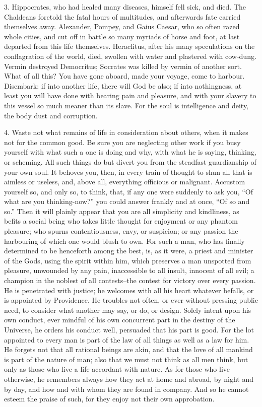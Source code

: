 \documentclass{book}
\begin{document}
3. Hippocrates, who had healed many diseases, himself fell sick, and
died. The Chaldeans foretold the fatal hours of multitudes, and
afterwards fate carried themselves away. Alexander, Pompey, and Gaius
Caesar, who so often razed whole cities, and cut off in battle so many
myriads of horse and foot, at last departed from this life
themselves. Heraclitus, after his many speculations on the
conflagration of the world, died, swollen with water and plastered
with cow-dung. Vermin destroyed Democritus; Socrates was killed by
vermin of another sort. What of all this? You have gone aboard, made
your voyage, come to harbour. Disembark: if into another life, there
will God be also; if into nothingness, at least you will have done
with bearing pain and pleasure, and with your slavery to this vessel
so much meaner than its slave. For the soul is intelligence and deity,
the body dust and corruption.

4. Waste not what remains of life in consideration about others, when
it makes not for the common good. Be sure you are neglecting other
work if you busy yourself with what such a one is doing and why, with
what he is saying, thinking, or scheming. All such things do but
divert you from the steadfast guardianship of your own soul. It
behoves you, then, in every train of thought to shun all that is
aimless or useless, and, above all, everything officious or
malignant. Accustom yourself so, and only so, to think, that, if any
one were suddenly to ask you, ``Of what are you thinking-now?'' you
could answer frankly and at once, ``Of so and so.'' Then it will plainly
appear that you are all simplicity and kindliness, as befits a social
being who takes little thought for enjoyment or any phantom pleasure;
who spurns contentiousness, envy, or suspicion; or any passion the
harbouring of which one would blush to own. For such a man, who has
finally determined to be henceforth among the best, is, as it were, a
priest and minister of the Gods, using the spirit within him, which
preserves a man unspotted from pleasure, unwounded by any pain,
inaccessible to all insult, innocent of all evil; a champion in the
noblest of all contests--the contest for victory over every
passion. He is penetrated with justice; he welcomes with all his heart
whatever befalls, or is appointed by Providence. He troubles not
often, or ever without pressing public need, to consider what another
may say, or do, or design. Solely intent upon his own conduct, ever
mindful of his own concurrent part in the destiny of the Universe, he
orders his conduct well, persuaded that his part is good. For the lot
appointed to every man is part of the law of all things as well as a
law for him. He forgets not that all rational beings are akin, and
that the love of all mankind is part of the nature of man; also that
we must not think as all men think, but only as those who live a life
accordant with nature. As for those who live otherwise, he remembers
always how they act at home and abroad, by night and by day, and how
and with whom they are found in company. And so he cannot esteem the
praise of such, for they enjoy not their own approbation.
\end{document}

